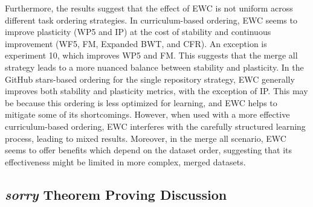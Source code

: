 \documentclass{article} %
\begin{document}

Furthermore, the results suggest that the effect of EWC is not uniform across different task ordering strategies. In curriculum-based ordering, EWC seems to improve plasticity (WP5 and IP) at the cost of stability and continuous improvement (WF5, FM, Expanded BWT, and CFR). An exception is experiment 10, which improves WP5 and FM. This suggests that the merge all strategy leads to a more nuanced balance between stability and plasticity. In the GitHub stars-based ordering for the single repository strategy, EWC generally improves both stability and plasticity metrics, with the exception of IP. This may be because this ordering is less optimized for learning, and EWC helps to mitigate some of its shortcomings. However, when used with a more effective curriculum-based ordering, EWC interferes with the carefully structured learning process, leading to mixed results. Moreover, in the merge all scenario, EWC seems to offer benefits which depend on the dataset order, suggesting that its effectiveness might be limited in more complex, merged datasets.



\subsection{\textit{sorry} Theorem Proving Discussion}
\end{document}
